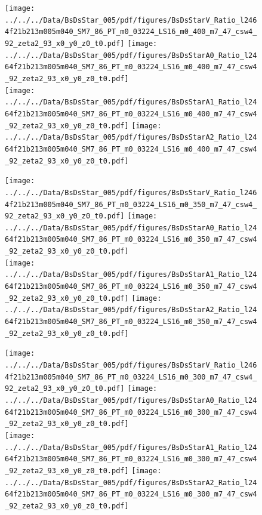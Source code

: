 \documentclass[a4paper,10pt]{article}
\begin{document}
\begin{figure}[p]
 \texttt{[image: ../../../Data/BsDsStar\_005/pdf/figures/BsDsStarV\_Ratio\_l2464f21b213m005m040\_SM7\_86\_PT\_m0\_03224\_LS16\_m0\_400\_m7\_47\_csw4\_92\_zeta2\_93\_x0\_y0\_z0\_t0.pdf]}  
\texttt{[image: ../../../Data/BsDsStar\_005/pdf/figures/BsDsStarA0\_Ratio\_l2464f21b213m005m040\_SM7\_86\_PT\_m0\_03224\_LS16\_m0\_400\_m7\_47\_csw4\_92\_zeta2\_93\_x0\_y0\_z0\_t0.pdf]} \\ 
\texttt{[image: ../../../Data/BsDsStar\_005/pdf/figures/BsDsStarA1\_Ratio\_l2464f21b213m005m040\_SM7\_86\_PT\_m0\_03224\_LS16\_m0\_400\_m7\_47\_csw4\_92\_zeta2\_93\_x0\_y0\_z0\_t0.pdf]}  
\texttt{[image: ../../../Data/BsDsStar\_005/pdf/figures/BsDsStarA2\_Ratio\_l2464f21b213m005m040\_SM7\_86\_PT\_m0\_03224\_LS16\_m0\_400\_m7\_47\_csw4\_92\_zeta2\_93\_x0\_y0\_z0\_t0.pdf]} \\ 
\end{figure} 
\clearpage

\begin{figure}[p]
 \texttt{[image: ../../../Data/BsDsStar\_005/pdf/figures/BsDsStarV\_Ratio\_l2464f21b213m005m040\_SM7\_86\_PT\_m0\_03224\_LS16\_m0\_350\_m7\_47\_csw4\_92\_zeta2\_93\_x0\_y0\_z0\_t0.pdf]}  
\texttt{[image: ../../../Data/BsDsStar\_005/pdf/figures/BsDsStarA0\_Ratio\_l2464f21b213m005m040\_SM7\_86\_PT\_m0\_03224\_LS16\_m0\_350\_m7\_47\_csw4\_92\_zeta2\_93\_x0\_y0\_z0\_t0.pdf]} \\ 
\texttt{[image: ../../../Data/BsDsStar\_005/pdf/figures/BsDsStarA1\_Ratio\_l2464f21b213m005m040\_SM7\_86\_PT\_m0\_03224\_LS16\_m0\_350\_m7\_47\_csw4\_92\_zeta2\_93\_x0\_y0\_z0\_t0.pdf]}  
\texttt{[image: ../../../Data/BsDsStar\_005/pdf/figures/BsDsStarA2\_Ratio\_l2464f21b213m005m040\_SM7\_86\_PT\_m0\_03224\_LS16\_m0\_350\_m7\_47\_csw4\_92\_zeta2\_93\_x0\_y0\_z0\_t0.pdf]} \\ 
\end{figure} 
\clearpage

\begin{figure}[p]
 \texttt{[image: ../../../Data/BsDsStar\_005/pdf/figures/BsDsStarV\_Ratio\_l2464f21b213m005m040\_SM7\_86\_PT\_m0\_03224\_LS16\_m0\_300\_m7\_47\_csw4\_92\_zeta2\_93\_x0\_y0\_z0\_t0.pdf]}  
\texttt{[image: ../../../Data/BsDsStar\_005/pdf/figures/BsDsStarA0\_Ratio\_l2464f21b213m005m040\_SM7\_86\_PT\_m0\_03224\_LS16\_m0\_300\_m7\_47\_csw4\_92\_zeta2\_93\_x0\_y0\_z0\_t0.pdf]} \\ 
\texttt{[image: ../../../Data/BsDsStar\_005/pdf/figures/BsDsStarA1\_Ratio\_l2464f21b213m005m040\_SM7\_86\_PT\_m0\_03224\_LS16\_m0\_300\_m7\_47\_csw4\_92\_zeta2\_93\_x0\_y0\_z0\_t0.pdf]}  
\texttt{[image: ../../../Data/BsDsStar\_005/pdf/figures/BsDsStarA2\_Ratio\_l2464f21b213m005m040\_SM7\_86\_PT\_m0\_03224\_LS16\_m0\_300\_m7\_47\_csw4\_92\_zeta2\_93\_x0\_y0\_z0\_t0.pdf]} \\ 
\end{figure} 
\clearpage
\end{document}
